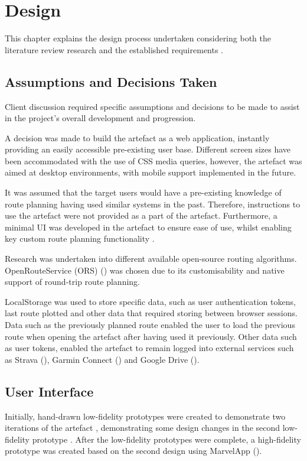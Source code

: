 \chapter{Design}
\label{chap:design}

This chapter explains the design process undertaken considering both the literature review research  and the established requirements .
\section{Assumptions and Decisions Taken}
\label{design:assumptions/decisions}

Client discussion required specific assumptions and decisions to be made to assist in the project's overall development and progression.

A decision was made to build the artefact as a web application, instantly providing an easily accessible pre-existing user base. Different screen sizes have been accommodated with the use of CSS media queries, however, the artefact was aimed at desktop environments, with mobile support implemented in the future. 

It was assumed that the target users would have a pre-existing knowledge of route planning having used similar systems in the past. Therefore, instructions to use the artefact were not provided as a part of the artefact. Furthermore, a minimal UI was developed in the artefact to ensure ease of use, whilst enabling key custom route planning functionality .

Research was undertaken into different available open-source routing algorithms. OpenRouteService (ORS) (\cite{noauthor_openrouteservice_nodate}) was chosen due to its customisability and native support of round-trip route planning.

LocalStorage was used to store specific data, such as user authentication tokens, last route plotted and other data that required storing between browser sessions. Data such as the previously planned route enabled the user to load the previous route when opening the artefact after having used it previously. Other data such as user tokens, enabled the artefact to remain logged into external services such as Strava (\cite{noauthor_strava_nodate}), Garmin Connect (\cite{international_garmin_nodate}) and Google Drive (\cite{noauthor_home_nodate}).

\section{User Interface}
\label{design:ui}
Initially, hand-drawn low-fidelity prototypes were created to demonstrate two iterations of the artefact , demonstrating some design changes in the second low-fidelity prototype . After the low-fidelity prototypes were complete, a high-fidelity prototype was created based on the second design using MarvelApp (\cite{noauthor_marvel_nodate}).

